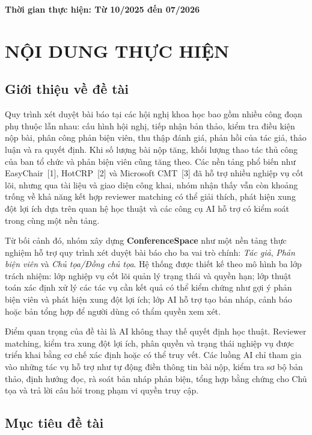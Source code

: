 \documentclass[12pt,a4paper]{article}
\begin{document}
\textbf{Thời gian thực hiện: Từ 10/2025 đến 07/2026}

\section{NỘI DUNG THỰC HIỆN}

\subsection{Giới thiệu về đề tài}
\justifying

Quy trình xét duyệt bài báo tại các hội nghị khoa học bao gồm nhiều công đoạn phụ thuộc lẫn nhau: cấu hình hội nghị, tiếp nhận bản thảo, kiểm tra điều kiện nộp bài, phân công phản biện viên, thu thập đánh giá, phản hồi của tác giả, thảo luận và ra quyết định. Khi số lượng bài nộp tăng, khối lượng thao tác thủ công của ban tổ chức và phản biện viên cũng tăng theo. Các nền tảng phổ biến như EasyChair~[1], HotCRP~[2] và Microsoft CMT~[3] đã hỗ trợ nhiều nghiệp vụ cốt lõi, nhưng qua tài liệu và giao diện công khai, nhóm nhận thấy vẫn còn khoảng trống về khả năng kết hợp reviewer matching có thể giải thích, phát hiện xung đột lợi ích dựa trên quan hệ học thuật và các công cụ AI hỗ trợ có kiểm soát trong cùng một nền tảng.

Từ bối cảnh đó, nhóm xây dựng \textbf{ConferenceSpace} như một nền tảng thực nghiệm hỗ trợ quy trình xét duyệt bài báo cho ba vai trò chính: \textit{Tác giả}, \textit{Phản biện viên} và \textit{Chủ tọa/Đồng chủ tọa}. Hệ thống được thiết kế theo mô hình ba lớp trách nhiệm: lớp nghiệp vụ cốt lõi quản lý trạng thái và quyền hạn; lớp thuật toán xác định xử lý các tác vụ cần kết quả có thể kiểm chứng như gợi ý phản biện viên và phát hiện xung đột lợi ích; lớp AI hỗ trợ tạo bản nháp, cảnh báo hoặc bản tổng hợp để người dùng có thẩm quyền xem xét.

Điểm quan trọng của đề tài là AI không thay thế quyết định học thuật. Reviewer matching, kiểm tra xung đột lợi ích, phân quyền và trạng thái nghiệp vụ được triển khai bằng cơ chế xác định hoặc có thể truy vết. Các luồng AI chỉ tham gia vào những tác vụ hỗ trợ như tự động điền thông tin bài nộp, kiểm tra sơ bộ bản thảo, định hướng đọc, rà soát bản nháp phản biện, tổng hợp bằng chứng cho Chủ tọa và trả lời câu hỏi trong phạm vi quyền truy cập.

\subsection{Mục tiêu đề tài}
\justifying
\end{document}
